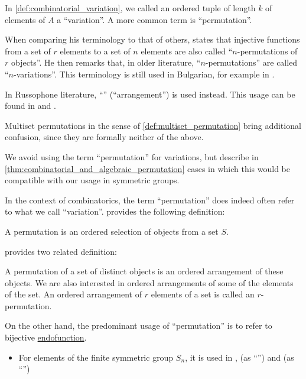 \begin{remark}\label{rem:combinatorial_permutation_terminology}
  In \cref{def:combinatorial_variation}, we called an ordered tuple of length \( k \) of elements of \( A \) a \enquote{variation}. A more common term is \enquote{permutation}.

  When comparing his terminology to that of others, \textcite[29]{Aigner1997CombinatorialTheory} states that injective functions from a set of \( r \) elements to a set of \( n \) elements are also called \enquote{\( n \)-permutations of \( r \) objects}. He then remarks that, in older literature, \enquote{\( n \)-permutations} are called \enquote{\( n \)-variations}. This terminology is still used in Bulgarian, for example in \cite[27]{ДимитровЯнев2007ВероятностиИСтатистика}.

  In Russophone literature, \enquote{} (\enquote{arrangement}) is used instead. This usage can be found in \cite[171]{Яблонский2003ДискретнаяМатематика} and \textcite[100]{БелоусовТкачёв2004ДискретнаяМатематика}.

  Multiset permutations in the sense of \cref{def:multiset_permutation} bring additional confusion, since they are formally neither of the above.

  We avoid using the term \enquote{permutation} for variations, but describe in \cref{thm:combinatorial_and_algebraic_permutation} cases in which this would be compatible with our usage in symmetric groups.

  In the context of combinatorics, the term \enquote{permutation} does indeed often refer to what we call \enquote{variation}. \Textcite[1]{Hall1986CombinatorialTheory} provides the following definition:
  \begin{displayquote}
    A permutation is an ordered selection of objects from a set \( S \).
  \end{displayquote}

  \textcite[429]{Rosen2019DiscreteMathematics} provides two related definition:
  \begin{displayquote}
    A permutation of a set of distinct objects is an ordered arrangement of these objects. We are also interested in ordered arrangements of some of the elements of the set. An ordered arrangement of \( r \) elements of a set is called an \( r \)-permutation.
  \end{displayquote}

  On the other hand, the predominant usage of \enquote{permutation} is to refer to bijective \hyperref[def:endofunction]{endofunction}.
  \begin{itemize}
    \item For elements of the finite symmetric group \( S_n \), it is used in
    \cite[31]{Jacobson1985BasicAlgebraI},
    \cite[78]{Винберг2014КурсАлгебры} (as \enquote{}) and
    \cite[82]{Тыртышников2017ОсновыАлгебры} (as \enquote{})


\end{itemize}
\end{remark}
